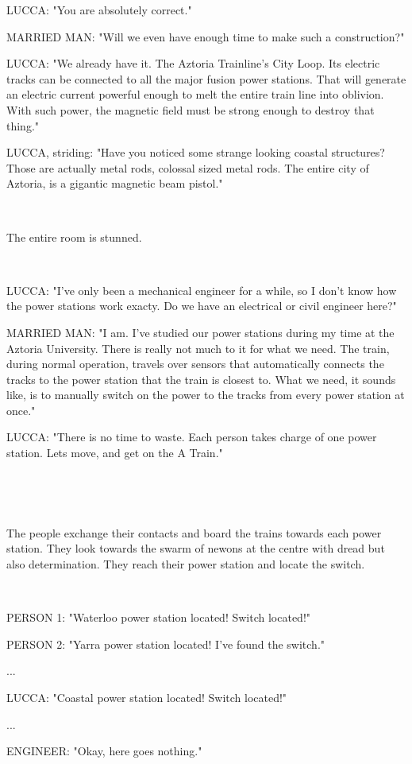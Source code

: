 \documentclass[11pt]{article}
\begin{document}
LUCCA: "You are absolutely correct."

MARRIED MAN: "Will we even have enough time to make such a construction?"

LUCCA: "We already have it. 
The Aztoria Trainline's City Loop. 
Its electric tracks can be connected to all the major fusion power stations.
That will generate an electric current powerful enough to melt the entire train line into oblivion. 
With such power, the magnetic field must be strong enough to destroy that thing."

LUCCA, striding: "Have you noticed some strange looking coastal structures? 
Those are actually metal rods, colossal sized metal rods.
The entire city of Aztoria, is a gigantic magnetic beam pistol."

\ 

The entire room is stunned. 

\ 

LUCCA: "I've only been a mechanical engineer for a while, so I don't know how the power stations work exacty. Do we have an electrical or civil engineer here?"

MARRIED MAN: "I am. 
I've studied our power stations during my time at the Aztoria University.
There is really not much to it for what we need. 
The train, during normal operation, travels over sensors that automatically connects the tracks to the power station that the train is closest to.
What we need, it sounds like, is to manually switch on the power to the tracks from every power station at once." 

LUCCA: "There is no time to waste. 
Each person takes charge of one power station.
Lets move, and get on the A Train."

\ 

\ 

The people exchange their contacts and board the trains towards each power station.
They look towards the swarm of newons at the centre with dread but also determination.
They reach their power station and locate the switch. 

\ 

PERSON 1: "Waterloo power station located! Switch located!"

PERSON 2: "Yarra power station located! I've found the switch." 

...

LUCCA: "Coastal power station located! Switch located!"

...

ENGINEER: "Okay, here goes nothing."
\end{document}
